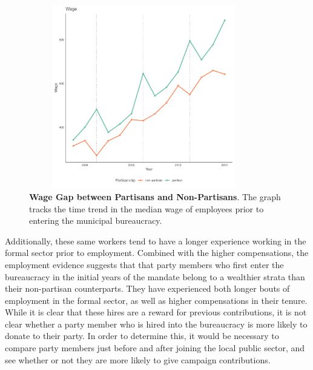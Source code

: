 \begin{figure}[H]
    \centering
    \includegraphics[width = 10cm, height = 8cm]{chapters/chapter_3/figures/partisanship/plot_median_wage.pdf}
    \caption{\textbf{Wage Gap between Partisans and Non-Partisans}. The graph tracks the time trend in the median wage of employees prior to entering the municipal bureaucracy.}
    \label{fig:wage_differential}
\end{figure}

Additionally, these same workers tend to have a longer experience working in the formal sector prior to employment. Combined with the higher compensations, the employment evidence suggests that that party members who first enter the bureaucracy in the initial years of the mandate belong to a wealthier strata than their non-partisan counterparts. They have experienced both longer bouts of employment in the formal sector, as well as higher compensations in their tenure. While it is clear that these hires are a reward for previous contributions, it is not clear whether a party member who is hired into the bureaucracy is more likely to donate to their party. In order to determine this, it would be necessary to compare party members just before and after joining the local public sector, and see whether or not they are more likely to give campaign contributions.

